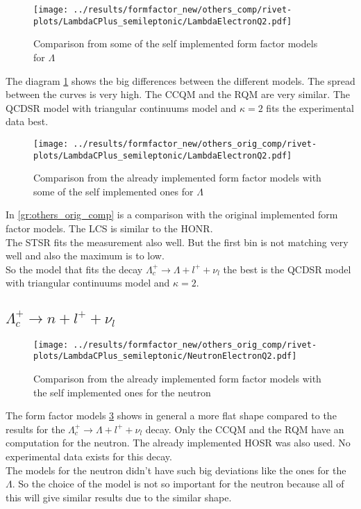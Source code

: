 \begin{figure}[h]
  \centering
  \texttt{[image: ../results/formfactor\_new/others\_comp/rivet-plots/LambdaCPlus\_semileptonic/LambdaElectronQ2.pdf]}
  \caption{Comparison from some of the self implemented form factor models for \(\Lambda\)} \label{gr:others_comp}
\end{figure}
The diagram {\ref{gr:others_comp}} shows the big differences between the 
different models. The spread between the curves is very high. The CCQM and 
the RQM are very similar. The QCDSR model with triangular continuums model 
and \(\kappa = 2\) fits the experimental data best.\\

\begin{figure}[h]
  \centering
  \texttt{[image: ../results/formfactor\_new/others\_orig\_comp/rivet-plots/LambdaCPlus\_semileptonic/LambdaElectronQ2.pdf]}
  \caption{Comparison from the already implemented form factor models with 
  some of the self implemented ones for \(\Lambda\)} \label{gr:others_orig_comp}
\end{figure}
In {\eqref{gr:others_orig_comp}} is a comparison with the original implemented 
form factor models. The LCS is similar to the HONR.\\
The STSR fits the measurement also well. But the first bin is not matching 
very well and also the maximum is to low.\\

So the model that fits the decay \(\Lambda_c^+ \rightarrow \Lambda + l^+ + \nu_l\) 
the best is the QCDSR model with triangular continuums model and \(\kappa = 2\).


\clearpage
\subsection{\(\Lambda_c^+ \rightarrow n + l^+ + \nu_l\)}
\begin{figure}[h]
  \centering
  \texttt{[image: ../results/formfactor\_new/others\_orig\_comp/rivet-plots/LambdaCPlus\_semileptonic/NeutronElectronQ2.pdf]}
  \caption{Comparison from the already implemented form factor models with 
  the self implemented ones for the neutron} \label{gr:others_orig_comp_n}
\end{figure}
The form factor models {\ref{gr:others_orig_comp_n}} shows in general a more 
flat shape compared to the results for the \(\Lambda_c^+ \rightarrow \Lambda + l^+ + \nu_l\) 
decay. Only the CCQM and the RQM have an computation for the neutron.
The already implemented HOSR was also used. No experimental data exists for this 
decay.\\ 
The models for the neutron didn't have such big deviations like the ones for the \(\Lambda\). 
So the choice of the model is not so important for the neutron because all of this 
will give similar results due to the similar shape.


